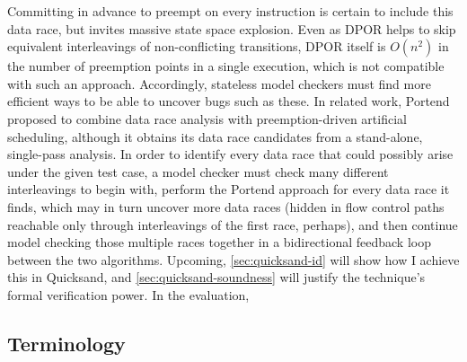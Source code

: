 Committing in advance to
preempt on every instruction is certain to include this data race,
but invites massive state space explosion.
Even as DPOR helps to skip equivalent interleavings of non-conflicting transitions,
DPOR itself is $O(n^2)$ in the number of preemption points in a single execution,
which is not compatible with such an approach.
Accordingly, stateless model checkers must find more efficient ways to be able to uncover bugs such as these.
%
In related work,
Portend~\cite{portend} proposed to combine data race analysis with preemption-driven artificial scheduling,
although it obtains its data race candidates from a stand-alone, single-pass analysis.
In order to
identify every
data race that could possibly arise under the given test case,
a model checker must check many different interleavings to begin with,
perform the Portend approach for every data race it finds,
which may in turn uncover more data races
(hidden in flow control paths reachable only through interleavings of the first race, perhaps),
and then continue model checking those multiple races together
in a
bidirectional feedback loop between the two algorithms.
Upcoming,
\cref{sec:quicksand-id} will show how I achieve this in Quicksand, and
\cref{sec:quicksand-soundness} will justify the technique's formal verification power.
In the evaluation, %

\subsection{Terminology}
\label{sec:quicksand-terminology}

